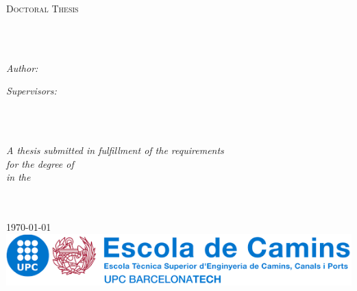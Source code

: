 \documentclass[
11pt,                   %
english,                %
singlespacing,          %
headsepline,            %
]{MastersDoctoralThesis}
\author{Miguel \textsc{Masó}} %
\begin{document}
\frontmatter %

\pagestyle{plain} %



\begin{titlepage}
\begin{center}

\vspace*{.06\textheight}
{\scshape\LARGE \univname\par}\vspace{1.5cm} %
\textsc{\Large Doctoral Thesis}\\[0.5cm] %

\HRule \\[0.4cm] %
{\huge \bfseries \ttitle\par}\vspace{0.4cm} %
\HRule \\[1.5cm] %
 
\begin{minipage}[t]{0.4\textwidth}
\begin{flushleft} \large
\emph{Author:}\\
\href{https://directori.upc.edu/directori/dadesPersona.jsp?id=1115243}{\authorname}
\end{flushleft}
\end{minipage}
\begin{minipage}[t]{0.4\textwidth}
\begin{flushright} \large
\emph{Supervisors:} \\
\href{http://www.cimne.com/eo}{\supname} \\
\href{https://www.cimne.com/1898/2181/people/directory}{\cosupname}
\end{flushright}
\end{minipage}\\[.3cm]
 
\vfill

\large \textit{A thesis submitted in fulfillment of the requirements\\ for the degree of \degreename}\\[0.3cm] %
\textit{in the}\\[0.3cm]
\groupname\\\deptname\\[.3cm] %
 
\vfill

{\large \today}\\[1cm]
\href{https://camins.upc.edu/}{
\includegraphics[width=.6\textwidth]{img/logo_caminos.png}
}
\vfill
\end{center}
\end{titlepage}
\end{document}
